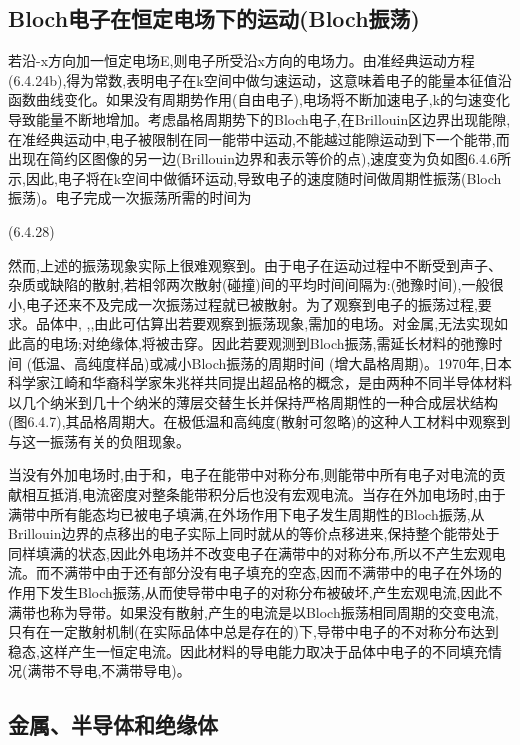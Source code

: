 \subsection{Bloch电子在恒定电场下的运动(Bloch振荡)}

若沿-x方向加一恒定电场E,则电子所受沿x方向的电场力。由准经典运动方程(6.4.24b),得为常数,表明电子在k空间中做匀速运动，这意味着电子的能量本征值沿函数曲线变化。如果没有周期势作用(自由电子),电场将不断加速电子,k的匀速变化导致能量不断地增加。考虑晶格周期势下的Bloch电子,在Brillouin区边界出现能隙,在准经典运动中,电子被限制在同一能带中运动,不能越过能隙运动到下一个能带,而出现在简约区图像的另一边(Brillouin边界和表示等价的点),速度变为负如图6.4.6所示,因此,电子将在k空间中做循环运动,导致电子的速度随时间做周期性振荡(Bloch振荡)。电子完成一次振荡所需的时间为

 	(6.4.28)



然而,上述的振荡现象实际上很难观察到。由于电子在运动过程中不断受到声子、杂质或缺陷的散射,若相邻两次散射(碰撞)间的平均时间间隔为:(弛豫时间),一般很小,电子还来不及完成一次振荡过程就已被散射。为了观察到电子的振荡过程,要求。品体中, ,,由此可估算出若要观察到振荡现象,需加的电场。对金属,无法实现如此高的电场;对绝缘体,将被击穿。因此若要观测到Bloch振荡,需延长材料的弛豫时间 (低温、高纯度样品)或减小Bloch振荡的周期时间 (增大晶格周期)。1970年,日本科学家江崎和华裔科学家朱兆祥共同提出超品格的概念，是由两种不同半导体材料以几个纳米到几十个纳米的薄层交替生长并保持严格周期性的一种合成层状结构(图6.4.7),其品格周期大。在极低温和高纯度(散射可忽略)的这种人工材料中观察到与这一振荡有关的负阻现象。

当没有外加电场时,由于和，电子在能带中对称分布,则能带中所有电子对电流的贡献相互抵消,电流密度对整条能带积分后也没有宏观电流。当存在外加电场时,由于满带中所有能态均已被电子填满,在外场作用下电子发生周期性的Bloch振荡,从Brillouin边界的点移出的电子实际上同时就从的等价点移进来,保持整个能带处于同样填满的状态,因此外电场并不改变电子在满带中的对称分布,所以不产生宏观电流。而不满带中由于还有部分没有电子填充的空态,因而不满带中的电子在外场的作用下发生Bloch振荡,从而使导带中电子的对称分布被破坏,产生宏观电流,因此不满带也称为导带。如果没有散射,产生的电流是以Bloch振荡相同周期的交变电流,只有在一定散射机制(在实际品体中总是存在的)下,导带中电子的不对称分布达到稳态,这样产生一恒定电流。因此材料的导电能力取决于品体中电子的不同填充情况(满带不导电,不满带导电)。

\subsection{金属、半导体和绝缘体}

